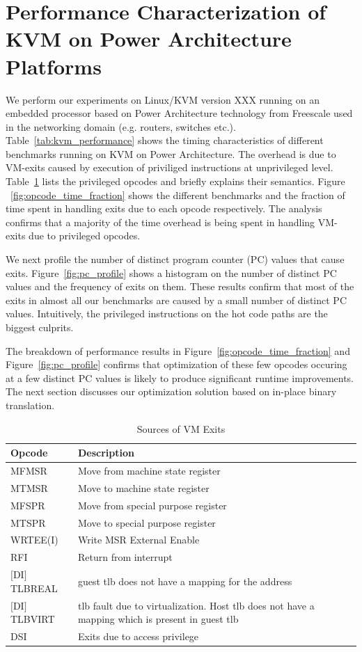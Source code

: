 \documentclass[10pt,twocolumn]{article}
\begin{document}
\section{Performance Characterization of KVM on Power Architecture Platforms}
\label{sec:performance_char}
We perform our experiments on Linux/KVM version XXX running on an
embedded processor based on Power Architecture technology from Freescale used in the networking
domain (e.g. routers, switches etc.).
Table~\ref{tab:kvm_performance} shows the timing characteristics of
different benchmarks running on KVM on Power Architecture. The
overhead is due to VM-exits caused by execution of priviliged instructions
at unprivileged level. Table~\ref{tab:priv_opcodes} lists the privileged
opcodes and briefly explains their semantics.
Figure ~\ref{fig:opcode_time_fraction} shows
the different benchmarks and the fraction of time spent in handling
exits due to each opcode respectively. The analysis confirms that a
majority of the time overhead is being spent in handling VM-exits due
to privileged opcodes.

We next profile the number of distinct program counter (PC) values that
cause exits. Figure~\ref{fig:pc_profile} shows a histogram on the number
of distinct PC values and the frequency of exits on them. These results
confirm that most of the exits in almost all our benchmarks are caused
by a small number of distinct PC values. Intuitively, the privileged
instructions on the hot code paths are the biggest culprits.

The breakdown of performance results in Figure~\ref{fig:opcode_time_fraction}
and Figure~\ref{fig:pc_profile} confirms that optimization of these
few opcodes occuring at a few distinct PC values is likely to produce
significant runtime improvements. The next section discusses our
optimization solution based on in-place binary translation.

\begin{table}[!b]
\centering
\caption{Sources of VM Exits}
     \begin{tabular}{|l | p{5cm} |} \hline
       Opcode \verb, , & Description \\ \hline
       MFMSR & Move from machine state register \\ \hline
       MTMSR & Move to machine state register \\\hline
	   MFSPR & Move from special purpose register \\\hline
	   MTSPR & Move to special purpose register \\\hline
	   WRTEE(I) & Write MSR External Enable  \\\hline
	   RFI & Return from interrupt \\\hline
	   $[$DI$]$TLBREAL & guest tlb does not have a mapping for the address\\\hline
	   $[$DI$]$TLBVIRT & tlb fault due to virtualization. Host tlb does not have a mapping which is present in guest tlb \\    \hline
   	   DSI & Exits due to access privilege \\\hline

     \end{tabular}
\label{tab:priv_opcodes}
\end{table}
\end{document}
